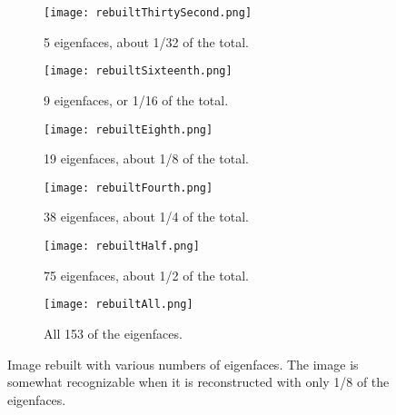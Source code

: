 \begin{figure}
\begin{subfigure}[b]{0.3\textwidth}
    \texttt{[image: rebuiltThirtySecond.png]}
    \caption{5 eigenfaces, about 1/32 of the total.}
    \label{fig:5_efaces}
\end{subfigure}
\begin{subfigure}[b]{0.3\textwidth}
    \texttt{[image: rebuiltSixteenth.png]}
    \caption{9 eigenfaces, or 1/16 of the total.}
    \label{fig:9_efaces}
\end{subfigure}
\begin{subfigure}[b]{0.3\textwidth}
    \texttt{[image: rebuiltEighth.png]}
    \caption{19 eigenfaces, about 1/8 of the total.}
    \label{fig:19_efaces}
\end{subfigure}
\begin{subfigure}[b]{0.3\textwidth}
    \texttt{[image: rebuiltFourth.png]}
    \caption{38 eigenfaces, about 1/4 of the total.}
    \label{fig:38_efaces}
\end{subfigure}
\begin{subfigure}[b]{0.3\textwidth}
    \texttt{[image: rebuiltHalf.png]}
    \caption{75 eigenfaces, about 1/2 of the total.}
    \label{fig:75_efaces}
\end{subfigure}
\begin{subfigure}[b]{0.3\textwidth}
    \texttt{[image: rebuiltAll.png]}
    \caption{All 153 of the eigenfaces.}
    \label{fig:all_efaces}
\end{subfigure}
\caption{Image rebuilt with various numbers of eigenfaces. The image is somewhat recognizable when it is reconstructed with only 1/8 of the eigenfaces.}
\label{fig:rebuiltImage}
\end{figure}

\begin{comment}
Of course, moving to a lower-dimensional subspace by using only the top $n$ eigenfaces introduces some error, in the sense that we cannot perfectly
reconstruct the face images from their coordinate vectors.
However, this error is tolerable, provided $n$ is not \emph{too} small.
Note that we can approximately reconstruct $\bar{f}_i$ from the coordinate vector $\hat{f}_i$ by
\[
\bar{f}_i \approx U_n\hat{f}_i.
\]
See Figure \ref{facialRecognition:rebuiltImage} for examples of reconstructed face images giving different numbers of eigenfaces.
\end{comment}

